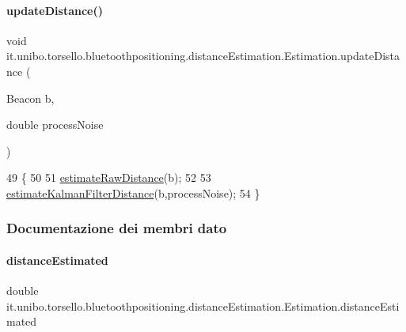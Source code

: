 \paragraph{\texorpdfstring{update\+Distance()}{updateDistance()}}
{\footnotesize\ttfamily void it.\+unibo.\+torsello.\+bluetoothpositioning.\+distance\+Estimation.\+Estimation.\+update\+Distance (\begin{DoxyParamCaption}\item[{Beacon}]{b,  }\item[{double}]{process\+Noise }\end{DoxyParamCaption})}


\begin{DoxyCode}
49                                                               \{
50 
51         \hyperlink{classit_1_1unibo_1_1torsello_1_1bluetoothpositioning_1_1distanceEstimation_1_1Estimation_a0cc72ed8871490402b1fac0a10520f7d_a0cc72ed8871490402b1fac0a10520f7d}{estimateRawDistance}(b);
52 
53         \hyperlink{classit_1_1unibo_1_1torsello_1_1bluetoothpositioning_1_1distanceEstimation_1_1Estimation_ac3451825d5672d5e761269afc563e88e_ac3451825d5672d5e761269afc563e88e}{estimateKalmanFilterDistance}(b,processNoise);
54     \}
\end{DoxyCode}


\subsubsection{Documentazione dei membri dato}
\hypertarget{classit_1_1unibo_1_1torsello_1_1bluetoothpositioning_1_1distanceEstimation_1_1Estimation_a7a5514b25ac6495842a53e54319be10d_a7a5514b25ac6495842a53e54319be10d}{}\label{classit_1_1unibo_1_1torsello_1_1bluetoothpositioning_1_1distanceEstimation_1_1Estimation_a7a5514b25ac6495842a53e54319be10d_a7a5514b25ac6495842a53e54319be10d} 
\paragraph{\texorpdfstring{distance\+Estimated}{distanceEstimated}}
{\footnotesize\ttfamily double it.\+unibo.\+torsello.\+bluetoothpositioning.\+distance\+Estimation.\+Estimation.\+distance\+Estimated\hspace{0.3cm}{\ttfamily [private]}}

